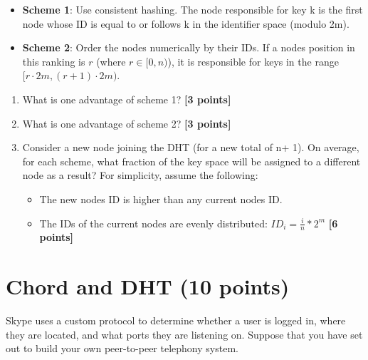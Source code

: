 \documentclass{article}
\begin{document}
\begin{itemize}
\item{\textbf{Scheme 1}: Use consistent hashing. The node responsible for key k is the first node whose ID is equal to or follows k in the identifier space (modulo 2m).}
\item{\textbf{Scheme 2}: Order the nodes numerically by their IDs. If a nodes
position in this ranking is $r$ (where $r \in [0, n)$), it is responsible for
keys in the range $[r\cdot 2m, (r+1)\cdot 2m)$.}
\end{itemize}

\begin{enumerate}
\item{What is one advantage of scheme 1? \textbf{[3 points]}}

\item{What is one advantage of scheme 2? \textbf{[3 points]}}

\item{Consider a new node joining the DHT (for a new total of n+ 1). On
average, for each scheme, what fraction of the key space will be assigned to a
different node as a result? For simplicity, assume the following:
\begin{itemize}
\item{The new nodes ID is higher than any current nodes ID.}
\item{The IDs of the current nodes are evenly distributed: $ID_i = \frac{i}{n}
* 2^m$} \textbf{[6 points]}
\end{itemize}}

\end{enumerate}


\section{Chord and DHT (10 points)}
Skype uses a custom protocol to determine whether a user is logged
in, where they are located, and what ports they are listening on.
Suppose that you have set out to build your own peer-to-peer telephony
system.
\end{document}
